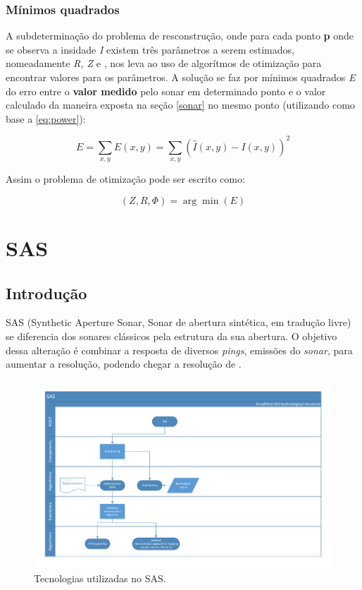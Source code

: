 \documentclass[a4paper,11pt,oneside,brazilian]{article}
\begin{document}
\subsubsection{Mínimos quadrados}

A subdeterminação do problema de resconstrução, onde para cada ponto \textbf{p}
onde se observa a insidade \emph{I} existem três parâmetros a serem estimados,
nomeadamente \emph{R, Z} e \textPhi , nos leva ao uso de algorítmos de
otimização para encontrar valores para os parâmetros. A solução se faz por
mínimos quadrados \emph{E} do erro entre o \textbf{valor medido} pelo sonar em
determinado ponto e o valor calculado da maneira exposta na seção \ref{sonar}
no mesmo ponto (utilizando como base a \eqref{eq:power}):

\[
E = \sum_{x,y}^{} E(x,y) = \sum_{x,y}^{} \left( \hat{I}(x,y) - I(x,y)\right)^2
\]


Assim o problema de otimização pode ser escrito como:

\[
(Z,R,\Phi) = \arg\min(E)
\]


\section{SAS}

\subsection{Introdução}
SAS (Synthetic Aperture Sonar, Sonar de abertura sintética, em tradução livre)
se diferencia dos sonares clássicos pela estrutura da sua abertura. O objetivo
dessa alteração é combinar a resposta de diversos \emph{pings}, emissões do
\emph{sonar}, para aumentar a resolução, podendo chegar a resolução de
\cite{Hansen2011a}.

 \begin{figure}[ht]
    \centering
    \includegraphics[width=\columnwidth]{SASvisio}
    \caption{Tecnologias utilizadas no SAS.} 
    \label{fig:sastech}
\end{figure} 





\end{document}
